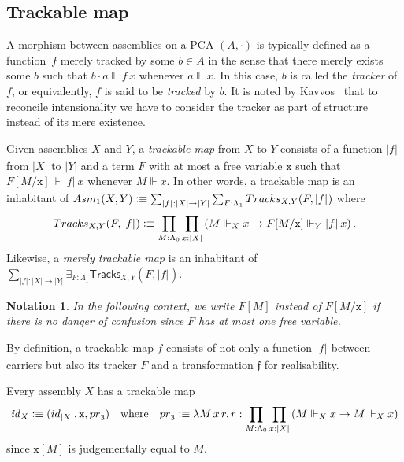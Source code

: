 \documentclass[a4paper,UKenglish,numberwithinsect,cleveref,thm-restate]{lipics-v2021}
\numberwithin{equation}{section}
\newcommand{\tproj}[3][]{\mathopen{}\left|#3\right|_{#2}^{#1}\mathclose{}}
\newcommand{\bproj}[1]{\tproj{}{#1}}
\newcommand{\Asm}{\mathsf{Asm}}
\newcommand{\defeq}{\vcentcolon\equiv}
\newcommand{\id}{\mathsf{id}}
\newcommand{\iid}{\mathit{id}}
\newcommand{\pr}{\mathsf{pr}}
\theoremstyle{plain}
\newtheorem*{notation*}{Notation}
\begin{document}
\subsection{Trackable map}%

A morphism between assemblies on a PCA $(A, \cdot)$ is typically defined as a function~$f$ merely tracked by some $b \in A$ in the sense that there merely exists some $b$ such that $b \cdot a \Vdash f\,x$ whenever $a \Vdash x$.
In this case, $b$ is called the \emph{tracker} of $f$, or equivalently, $f$ is said to be \emph{tracked} by $b$.
It is noted by Kavvos~\cite{Kavvos2017b} that to reconcile intensionality we have to consider the tracker as part of structure instead of its mere existence.
\begin{definition}\label{def:trackable}
  Given assemblies $X$ and $Y$, a \emph{trackable map} from $X$ to $Y$ consists of a function $\bproj{f}$ from $|X|$ to $|Y|$ and a term $F$ with at most a free variable $\mathtt{x}$ such that $F[M/\mathtt{x}] \Vdash \bproj{f}\,x$ whenever $M \Vdash x$.
  In other words, a trackable map is an inhabitant of $\Asm_1(X, Y) \defeq \sum_{\bproj{f} : |X| \to |Y|} \sum_{F : \Lambda_1} \mathsf{Tracks}_{X, Y}(F, \bproj{f})$ where
  \[
    \mathsf{Tracks}_{X, Y}(F, \bproj{f}) \defeq \prod_{M : \Lambda_0} \prod_{x : |X|}
    \left( M \Vdash_X x \to F[M/\mathtt{x}] \Vdash_Y \bproj{f}\, x \right).
  \]
  Likewise, a \emph{merely trackable map} is an inhabitant of $\sum_{\bproj{f} : |X| \to |Y|} \exists_{F : \Lambda_1}\mathsf{Tracks}_{X, Y}(F, \bproj{f})$. 
\end{definition}

\begin{notation*}
  In the following context, we write $F[M]$ instead of $F[M/\mathtt{x}]$ if there is no danger of confusion since $F$ has at most one free variable.
\end{notation*}
By definition, a trackable map $f$ consists of not only a function $\bproj{f}$ between carriers but also its tracker $F$ and a transformation $\mathfrak{f}$ for realisability.

\begin{example}[Identity]
  Every assembly $X$ has a trackable map
  \[
    \iid_X \defeq (\id_{|X|}, \mathtt{x}, \pr_3)
    \quad\text{where}\quad
  \pr_3 \defeq \lambda M\,x\,r.\, r : \prod_{M : \Lambda_0} \prod_{x : |X|} \left( M \Vdash_X x \to M  \Vdash_X x  \right)
  \]
  since $\mathtt{x}[M]$ is judgementally equal to $M$.
\end{example}
\end{document}
